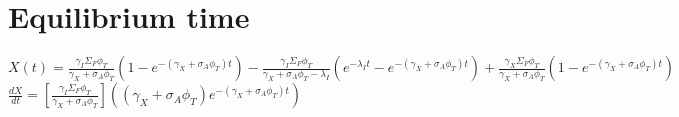 \documentclass[11pt,a4paper]{article}
\begin{document}
\newpage

\section{Equilibrium time}
$X(t)=\frac{\gamma_I\Sigma_F\phi_T}{\gamma_X+\sigma_A\phi_T}(1-e^{-(\gamma_X+\sigma_A\phi_T)t})-\frac{\gamma_I\Sigma_F\phi_T}{\gamma_X+\sigma_A\phi_T-\lambda_I}(e^{-\lambda_I t}-e^{-(\gamma_X+\sigma_A\phi_T)t})+\frac{\gamma_X\Sigma_F\phi_T}{\gamma_X+\sigma_A\phi_T}(1-e^{-(\gamma_X+\sigma_A\phi_T)t})$ \\

\noindent $\frac{dX}{dt}=[\frac{\gamma_I\Sigma_F\phi_T}{\gamma_X+\sigma_A\phi_T}]((\gamma_X+\sigma_A\phi_T)e^{-(\gamma_X+\sigma_A\phi_T)t})
$
\end{document}
